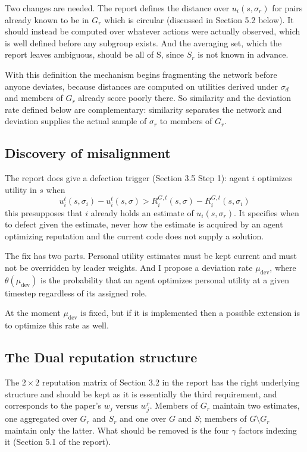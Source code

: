 \documentclass[12pt]{article}
\begin{document}
Two changes are needed. The report defines the distance over $u_i(s, \sigma_r)$ for pairs already known to be in $G_r$
which is circular (discussed in Section 5.2 below). It should instead be computed over whatever actions were actually observed,
which is well defined before any subgroup exists. And the averaging set, which the report leaves ambiguous,
should be all of S, since $S_r$ is not known in advance.

With this definition the mechanism begins fragmenting the network before anyone deviates, because distances
are computed on utilities derived under $\sigma_d$ and members of $G_r$ already score poorly there. So similarity
and the deviation rate defined below are complementary: similarity separates the network and deviation supplies the actual sample of $\sigma_r$
to members of $G_r$.

\subsection{Discovery of misalignment}
The report does give a defection trigger (Section 3.5 Step 1): agent $i$ optimizes utility in $s$
when
\[ u_i^t(s, \sigma_i) - u_i^t(s, \sigma) > R^{G, t}_i(s, \sigma) - R_i^{G, t}(s, \sigma_i) \]
this presupposes that $i$ already holds an estimate of $u_i(s, \sigma_r)$. It specifies when to defect given the estimate,
never how the estimate is acquired by an agent optimizing reputation and the current code does not supply a solution.

The fix has two parts. Personal utility estimates must be kept current and must not be overridden by leader weights.
And I propose a deviation rate $\mu_{\text{dev}}$, where $\theta(\mu_{\text{dev}})$ is the probability that
an agent optimizes personal utility at a given timestep regardless of its assigned role.

At the moment $\mu_{\text{dev}}$ is fixed, but if it is implemented then a possible extension is to optimize this rate as well.

\subsection{The Dual reputation structure}
The $2\times 2$ reputation matrix of Section 3.2 in the report has the right underlying structure and should be kept as it is essentially
the third requirement, and corresponds to the paper's $w_j$ versus $w^r_j$. Members of $G_r$ maintain two estimates, one
aggregated over $G_r$ and $S_r$ and one over $G$ and $S$; members of $G \setminus G_r$ maintain only the
latter. What should be removed is the four $\gamma$ factors indexing it (Section 5.1 of the report).
 
\end{document}
